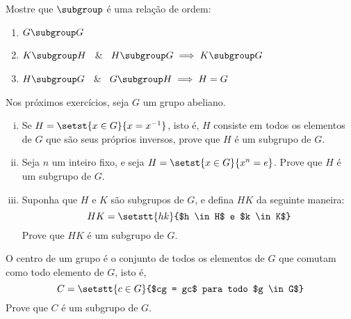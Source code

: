 \begin{exercise}
Mostre que $\subgroup$ é uma relação de ordem:
\begin{enumerate}[(1)]
    \item $G \subgroup G$
    \item $K \subgroup H$ \ \& \ $H \subgroup G \implies K \subgroup G$
    \item $H \subgroup G$ \ \& \ $G \subgroup H \implies H = G$ 
\end{enumerate} 
\end{exercise}

\begin{exercise}
Nos próximos exercícios, seja $G$ um grupo abeliano.
\begin{enumerate}[(i)]
    \item Se $H = \setst {x \in G} {x = x^{-1}}$, isto é, $H$ consiste em todos os elementos de $G$ que são seus próprios inversos, prove que $H$ é um subgrupo de $G$.
    \item Seja $n$ um inteiro fixo, e seja $H = \setst {x \in G} {x^n = e}$. Prove que $H$ é um subgrupo de $G$.
    \item Suponha que $H$ e $K$ são subgrupos de $G$, e defina $HK$ da seguinte maneira:
        $$
            HK = \setstt {hk}{$h \in H$ e $k \in K$}
        $$
        Prove que $HK$ é um subgrupo de $G$.
\end{enumerate}
\end{exercise}

\begin{exercise}
O centro de um grupo é o conjunto de todos os elementos de $G$ que comutam como todo elemento de $G$, isto é,
$$
    C = \setstt {c \in G} {$cg = gc$ para todo $g \in G$}
$$
Prove que $C$ é um subgrupo de $G$.
\end{exercise}
